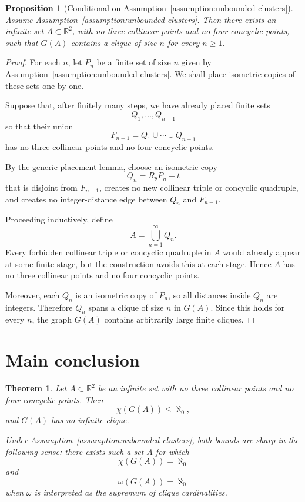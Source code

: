 \documentclass[11pt]{article}
\newtheorem{theorem}{Theorem}
\newtheorem{proposition}{Proposition}
\newcommand{\R}{\mathbb R}
\begin{document}
\begin{proposition}[Conditional on Assumption~\ref{assumption:unbounded-clusters}]
Assume Assumption~\ref{assumption:unbounded-clusters}. Then there exists an infinite set \(A\subset \R^2\), with no three collinear points and no four concyclic points, such that \(G(A)\) contains a clique of size \(n\) for every \(n\geq 1\).
\end{proposition}

\begin{proof}
For each \(n\), let \(P_n\) be a finite set of size \(n\) given by Assumption~\ref{assumption:unbounded-clusters}. We shall place isometric copies of these sets one by one.

Suppose that, after finitely many steps, we have already placed finite sets
\[
Q_1,\dots,Q_{n-1}
\]
so that their union
\[
F_{n-1}=Q_1\cup\cdots\cup Q_{n-1}
\]
has no three collinear points and no four concyclic points.

By the generic placement lemma, choose an isometric copy
\[
Q_n=R_\theta P_n+t
\]
that is disjoint from \(F_{n-1}\), creates no new collinear triple or concyclic quadruple, and creates no integer-distance edge between \(Q_n\) and \(F_{n-1}\).

Proceeding inductively, define
\[
A=\bigcup_{n=1}^{\infty} Q_n.
\]
Every forbidden collinear triple or concyclic quadruple in \(A\) would already appear at some finite stage, but the construction avoids this at each stage. Hence \(A\) has no three collinear points and no four concyclic points.

Moreover, each \(Q_n\) is an isometric copy of \(P_n\), so all distances inside \(Q_n\) are integers. Therefore \(Q_n\) spans a clique of size \(n\) in \(G(A)\). Since this holds for every \(n\), the graph \(G(A)\) contains arbitrarily large finite cliques.
\end{proof}

\section{Main conclusion}

\begin{theorem}
Let \(A\subset \R^2\) be an infinite set with no three collinear points and no four concyclic points. Then
\[
\chi(G(A))\leq \aleph_0,
\]
and \(G(A)\) has no infinite clique.

Under Assumption~\ref{assumption:unbounded-clusters}, both bounds are sharp in the following sense: there exists such a set \(A\) for which
\[
\chi(G(A))=\aleph_0
\]
and
\[
\omega(G(A))=\aleph_0
\]
when \(\omega\) is interpreted as the supremum of clique cardinalities.
\end{theorem}
\end{document}
